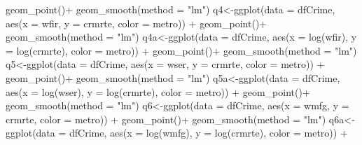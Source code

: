 \documentclass[]{article}
\newenvironment{Shaded}{}{}
\newcommand{\DataTypeTok}[1]{#1}
\newcommand{\KeywordTok}[1]{\textcolor[rgb]{0.00,0.00,1.00}{#1}}
\newcommand{\NormalTok}[1]{#1}
\newcommand{\OperatorTok}[1]{#1}
\newcommand{\StringTok}[1]{\textcolor[rgb]{0.00,0.50,0.50}{#1}}
\begin{document}
\begin{Shaded}
\begin{Highlighting}[]
\StringTok{      }\KeywordTok{geom_point}\NormalTok{()}\OperatorTok{+}
\StringTok{  }\KeywordTok{geom_smooth}\NormalTok{(}\DataTypeTok{method =} \StringTok{"lm"}\NormalTok{)}
\NormalTok{q4<-}\KeywordTok{ggplot}\NormalTok{(}\DataTypeTok{data =}\NormalTok{ dfCrime, }\KeywordTok{aes}\NormalTok{(}\DataTypeTok{x =}\NormalTok{ wfir, }\DataTypeTok{y =}\NormalTok{ crmrte, }\DataTypeTok{color =}\NormalTok{ metro)) }\OperatorTok{+}\StringTok{ }
\StringTok{      }\KeywordTok{geom_point}\NormalTok{()}\OperatorTok{+}
\StringTok{  }\KeywordTok{geom_smooth}\NormalTok{(}\DataTypeTok{method =} \StringTok{"lm"}\NormalTok{)}
\NormalTok{q4a<-}\KeywordTok{ggplot}\NormalTok{(}\DataTypeTok{data =}\NormalTok{ dfCrime, }\KeywordTok{aes}\NormalTok{(}\DataTypeTok{x =} \KeywordTok{log}\NormalTok{(wfir), }\DataTypeTok{y =} \KeywordTok{log}\NormalTok{(crmrte), }\DataTypeTok{color =}\NormalTok{ metro)) }\OperatorTok{+}\StringTok{ }
\StringTok{      }\KeywordTok{geom_point}\NormalTok{()}\OperatorTok{+}
\StringTok{  }\KeywordTok{geom_smooth}\NormalTok{(}\DataTypeTok{method =} \StringTok{"lm"}\NormalTok{)}
\NormalTok{q5<-}\KeywordTok{ggplot}\NormalTok{(}\DataTypeTok{data =}\NormalTok{ dfCrime, }\KeywordTok{aes}\NormalTok{(}\DataTypeTok{x =}\NormalTok{ wser, }\DataTypeTok{y =}\NormalTok{ crmrte, }\DataTypeTok{color =}\NormalTok{ metro)) }\OperatorTok{+}\StringTok{ }
\StringTok{      }\KeywordTok{geom_point}\NormalTok{()}\OperatorTok{+}
\StringTok{  }\KeywordTok{geom_smooth}\NormalTok{(}\DataTypeTok{method =} \StringTok{"lm"}\NormalTok{)}
\NormalTok{q5a<-}\KeywordTok{ggplot}\NormalTok{(}\DataTypeTok{data =}\NormalTok{ dfCrime, }\KeywordTok{aes}\NormalTok{(}\DataTypeTok{x =} \KeywordTok{log}\NormalTok{(wser), }\DataTypeTok{y =} \KeywordTok{log}\NormalTok{(crmrte), }\DataTypeTok{color =}\NormalTok{ metro)) }\OperatorTok{+}\StringTok{ }
\StringTok{      }\KeywordTok{geom_point}\NormalTok{()}\OperatorTok{+}
\StringTok{  }\KeywordTok{geom_smooth}\NormalTok{(}\DataTypeTok{method =} \StringTok{"lm"}\NormalTok{)}
\NormalTok{q6<-}\KeywordTok{ggplot}\NormalTok{(}\DataTypeTok{data =}\NormalTok{ dfCrime, }\KeywordTok{aes}\NormalTok{(}\DataTypeTok{x =}\NormalTok{ wmfg, }\DataTypeTok{y =}\NormalTok{ crmrte, }\DataTypeTok{color =}\NormalTok{ metro)) }\OperatorTok{+}\StringTok{ }
\StringTok{      }\KeywordTok{geom_point}\NormalTok{()}\OperatorTok{+}
\StringTok{  }\KeywordTok{geom_smooth}\NormalTok{(}\DataTypeTok{method =} \StringTok{"lm"}\NormalTok{)}
\NormalTok{q6a<-}\KeywordTok{ggplot}\NormalTok{(}\DataTypeTok{data =}\NormalTok{ dfCrime, }\KeywordTok{aes}\NormalTok{(}\DataTypeTok{x =} \KeywordTok{log}\NormalTok{(wmfg), }\DataTypeTok{y =} \KeywordTok{log}\NormalTok{(crmrte), }\DataTypeTok{color =}\NormalTok{ metro)) }\OperatorTok{+}\StringTok{ }

\end{Highlighting}
\end{Shaded}
\end{document}
